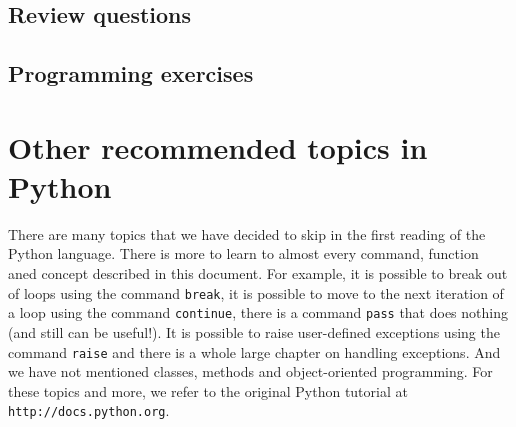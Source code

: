 \subsection{Review questions}

\subsection{Programming exercises}


\section{Other recommended topics in Python} \label{sec:adv}

There are many topics that we have decided to skip in the first reading 
of the Python language. There is more to learn to almost every command,
function aned concept described in this document. For example, it is possible
to break out of loops using the command {\tt break}, it is possible to 
move to the next iteration of a loop using the command {\tt continue},
there is a command {\tt pass} that does nothing (and still can be useful!). 
It is possible to 
raise user-defined exceptions using the command {\tt raise} and there
is a whole large chapter on handling exceptions. And we have not 
mentioned classes, methods and object-oriented programming. For these
topics and more, we refer to the original Python tutorial at 
{\tt http://docs.python.org}. 




